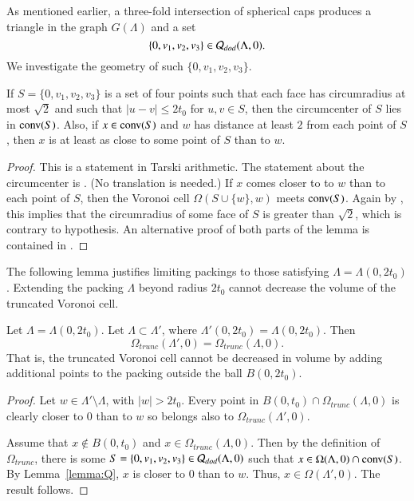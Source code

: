 As mentioned earlier, a three-fold intersection of spherical
caps produces a triangle in the graph $G(\Lambda)$ and a 
set 
$$\{0,v_1,v_2,v_3\}\in {\mathcal Q}_{dod}(\Lambda,0).$$
We investigate the geometry of such $\{0,v_1,v_2,v_3\}$.

\begin{lemma}\label{lemma:Q}
If $S=\{0,v_1,v_2,v_3\}$ is a set of four points such that each
face has circumradius at most $\sqrt2$ and such that
$|u-v|\le 2t_0$ for $u,v\in S$, then
the circumcenter of $S$ lies in ${\operatorname{conv}}(S)$.  Also, if $x
\in {\operatorname{conv}}(S)$ and $w$ has distance at least $2$ from each
point of $S$, then $x$ is at least as close to some point of $S$ than to
$w$.
\end{lemma}

\begin{proof} This is a statement in Tarski arithmetic.
The statement about the circumcenter is \cite[Lemma~5.18]{DCG}.
(No translation is needed.)
If $x$  comes closer to  to $w$  than to each point of $S$, then
the Voronoi cell $\Omega(S\cup\{w\},w)$ meets ${\operatorname{conv}}(S)$.
Again by \cite[Lemma~5.18]{DCG}, this implies that the circumradius
of some face of $S$ is greater than $\sqrt2$, which is contrary
to hypothesis. An alternative proof 
of both parts of the lemma
is contained in \cite[Lemma~3.5,3.6]{arx}.
\end{proof}

The following lemma justifies limiting packings to those
satisfying $\Lambda=\Lambda(0,2t_0)$.  Extending the packing
$\Lambda$ beyond radius $2t_0$ cannot decrease the volume of the
truncated Voronoi cell.

\begin{lemma}\label{lemma:trunc}  
Let $\Lambda=\Lambda(0,2t_0)$.  Let $\Lambda\subset\Lambda'$,
where $\Lambda'(0,2t_0) = \Lambda(0,2t_0)$.  Then
$$\Omega_{trunc}(\Lambda',0) = \Omega_{trunc}(\Lambda,0).
$$
That is, the truncated Voronoi cell cannot be decreased in volume by
adding additional points to the packing outside the ball $B(0,2t_0)$.
\end{lemma}

\begin{proof} Let $w\in \Lambda'\setminus\Lambda$, with $|w|>2t_0$.
Every point in $B(0,t_0)\cap \Omega_{trunc}(\Lambda,0)$ 
is clearly closer to $0$ than to $w$ so
belongs also to $\Omega_{trunc}(\Lambda',0)$.

Assume that $x\not\in B(0,t_0)$ and $x\in \Omega_{trunc}(\Lambda,0)$.
Then by the definition of $\Omega_{trunc}$,
there is some $S=\{0,v_1,v_2,v_3\}\in {\mathcal Q}_{dod}(\Lambda,0)$ such that
$x\in \Omega(\Lambda,0)\cap {\operatorname{conv}}(S)$.  By Lemma~\ref{lemma:Q},
$x$ is closer to $0$ than to $w$.  Thus, $x\in\Omega(\Lambda',0)$.
The result follows.
\end{proof}


